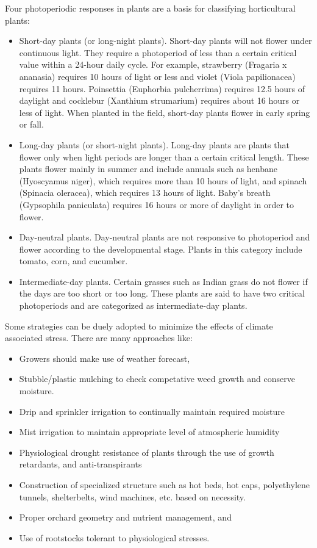 \documentclass[
  openany]{book}
\providecommand{\tightlist}{%
  \setlength{\itemsep}{0pt}\setlength{\parskip}{0pt}}
\begin{document}
Four photoperiodic responses in plants are a basis for classifying horticultural plants:

\begin{itemize}
\item
  Short-day plants (or long-night plants). Short-day plants will not flower under continuous light. They require a photoperiod of less than a certain critical value within a 24-hour daily cycle. For example, strawberry (Fragaria x ananasia) requires 10 hours of light or less and violet (Viola papilionacea) requires 11 hours. Poinsettia (Euphorbia pulcherrima) requires 12.5 hours of daylight and cocklebur (Xanthium strumarium) requires about 16 hours or less of light. When planted in the field, short-day plants flower in early spring or fall.
\item
  Long-day plants (or short-night plants). Long-day plants are plants that flower only when light periods are longer than a certain critical length. These plants flower mainly in summer and include annuals such as henbane (Hyoscyamus niger), which requires more than 10 hours of light, and spinach (Spinacia oleracea), which requires 13 hours of light. Baby's breath (Gypsophila paniculata) requires 16 hours or more of daylight in order to flower.
\item
  Day-neutral plants. Day-neutral plants are not responsive to photoperiod and flower according to the developmental stage. Plants in this category include tomato, corn, and cucumber.
\item
  Intermediate-day plants. Certain grasses such as Indian grass do not flower if the days are too short or too long. These plants are said to have two critical photoperiods and are categorized as intermediate-day plants.
\end{itemize}

Some strategies can be duely adopted to minimize the effects of climate associated stress. There are many approaches like:

\begin{itemize}
\tightlist
\item
  Growers should make use of weather forecast,
\item
  Stubble/plastic mulching to check competative weed growth and conserve moisture.
\item
  Drip and sprinkler irrigation to continually maintain required moisture
\item
  Mist irrigation to maintain appropriate level of atmospheric humidity
\item
  Physiological drought resistance of plants through the use of growth retardants, and anti-transpirants
\item
  Construction of specialized structure such as hot beds, hot caps, polyethylene tunnels, shelterbelts, wind machines, etc. based on necessity.
\item
  Proper orchard geometry and nutrient management, and
\item
  Use of rootstocks tolerant to physiological stresses.
\end{itemize}
\end{document}

